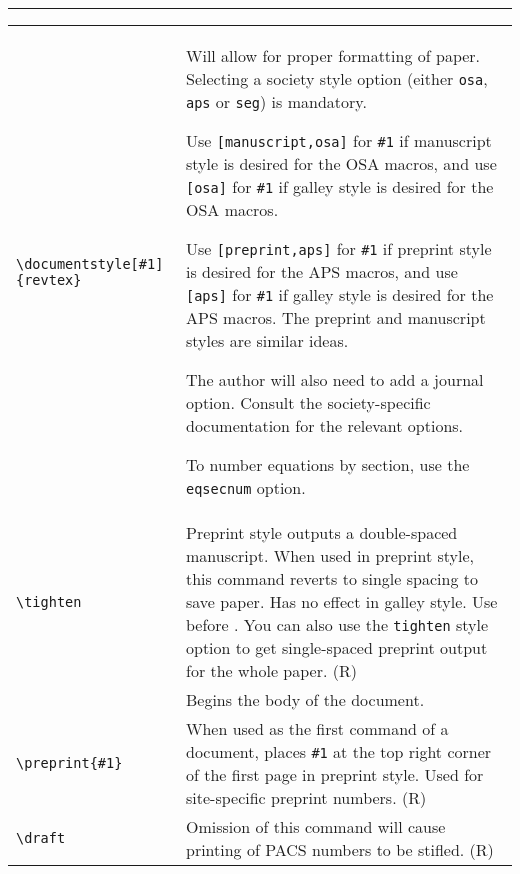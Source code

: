 \bigskip\hrule\bigskip
\begin{quasitable}
\begin{tabular}{lp{4.5in}}
\verb+\documentstyle[#1]{revtex}+ &
              Will allow for proper formatting of paper. Selecting
              a society style option (either \verb+osa+, \verb+aps+
              or \verb+seg+) is mandatory.

              Use \verb+[manuscript,osa]+ for \verb+#1+ if
              manuscript style is desired for the OSA macros,
              and use \verb+[osa]+ for
              \verb+#1+ if galley style is desired for the OSA macros.

              Use \verb+[preprint,aps]+ for \verb+#1+ if
              preprint style is desired for the APS macros,
              and use \verb+[aps]+ for
              \verb+#1+ if galley style is desired for the APS macros.
              The preprint and manuscript styles are similar ideas.

              The author will also need to add a journal option.
              Consult the society-specific documentation for the
              relevant options.

              To number
              equations by section, use the \verb+eqsecnum+
               option.\\[4pt]


\verb+\tighten+  &
           Preprint style outputs a double-spaced manuscript.
           When used in preprint style, this command reverts to
           single spacing to save paper. Has no effect in galley
           style.  Use before \verb++. You can
           also use the \verb+tighten+ style option to get
           single-spaced preprint output for the whole paper. (R)
             \\[4pt]

\verb++  &
        Begins the body of the \REVTeX{} document.
                          \\[4pt]

\verb+\preprint{#1}+  &
           When used as the first command of a document, places
           \verb+#1+ at the top right corner of the first page in
           preprint style. Used for site-specific preprint
           numbers. (R)
             \\[4pt]

\verb+\draft+  &
                  Omission of this command will cause printing of PACS
                        numbers to be stifled. (R)
                          \\[4pt]


\end{tabular}
\end{quasitable}
